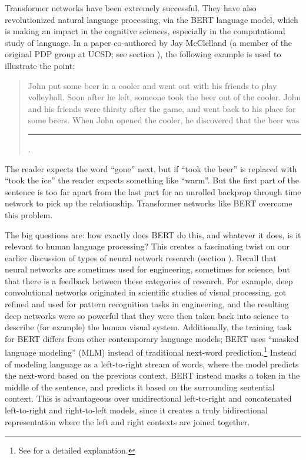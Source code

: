 Transformer networks have been extremely successful. They have also revolutionized natural language processing, via the BERT language model, which is making an impact in the cognitive sciences, especially in the computational study of language. In a paper co-authored by Jay McClelland  \cite{mcclelland2020placing} (a member of the original PDP group at UCSD; see section ), the following example is used to illustrate the point:
\begin{quote}
John put some beer in a cooler and went out with his friends to play volleyball. Soon after he left, someone took the beer out of the cooler. John and his friends were thirsty after the game, and went back to his place for some beers. When John opened the cooler, he discovered that the beer was \rule{1cm}{0.15mm}.
\end{quote}
The reader expects the word ``gone'' next, but if ``took the beer'' is replaced with ``took the ice'' the reader expects something like ``warm''. But the first part of the sentence is too far apart from the last part for an unrolled backprop through time network to pick up the relationship.  Transformer networks like BERT overcome this problem.

The big questions are: how exactly does BERT do this, and whatever it does, is it relevant to human language processing?  This creates a fascinating twist on our earlier discussion of types of neural network research (section ). Recall that neural networks are sometimes used for engineering, sometimes for science, but that there is a feedback between these categories of research. For example, deep convolutional networks originated in scientific studies of visual processing, got refined and used for pattern recognition tasks in engineering, and the resulting deep networks were so powerful that they were then taken back into science  to describe (for example) the human visual system.
Additionally, the training task for BERT differs from other contemporary language models; BERT uses ``masked language modeling'' (MLM) instead of traditional next-word prediction.\footnote{See \cite{devlin2018bert} for a detailed explanation.} Instead of modeling language as a left-to-right stream of words, where the model predicts the next-word based on the previous context, BERT instead masks a token in the middle of the sentence, and predicts it based on the surrounding sentential context. This is advantageous over unidirectional left-to-right and concatenated left-to-right and right-to-left models, since it creates a truly bidirectional representation where the left and right contexts are joined together.

